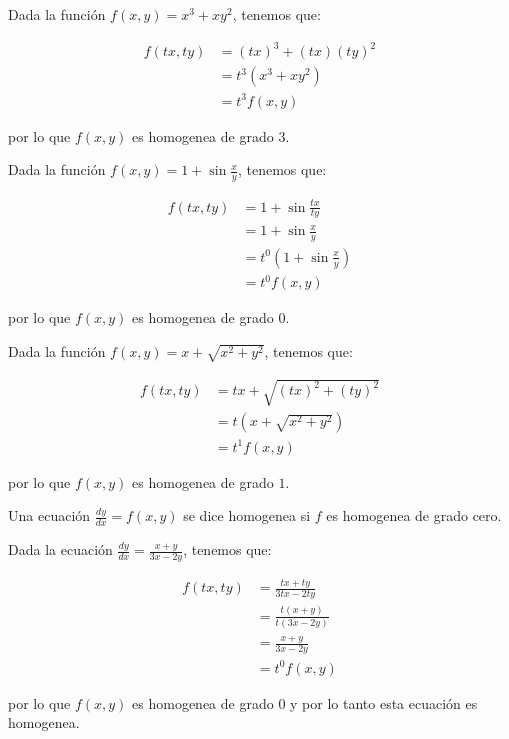 		\begin{ejemplo}
			Dada la función $f(x, y) = x^3 + x y^2$, tenemos que:

			\begin{align*}
				f(tx, ty) &= (tx)^3 + (tx) (ty)^2 \\
				&= t^3 (x^3 + xy^2) \\
				&= t^3 f(x, y)
			\end{align*}

			por lo que $f(x, y)$ es homogenea de grado $3$.
		\end{ejemplo}

		\begin{ejemplo}
			Dada la función $f(x, y) = 1 + \sin{\frac{x}{y}}$, tenemos que:

			\begin{align*}
				f(tx, ty) &= 1 + \sin{\frac{tx}{ty}} \\
				&= 1 + \sin{\frac{x}{y}} \\
				&= t^0 (1 + \sin{\frac{x}{y}}) \\
				&= t^0 f(x, y)
			\end{align*}

			por lo que $f(x, y)$ es homogenea de grado $0$.
		\end{ejemplo}

		\begin{ejemplo}
			Dada la función $f(x, y) = x + \sqrt{x^2 + y^2}$, tenemos que:

			\begin{align*}
				f(tx, ty) &= tx + \sqrt{(tx)^2 + (ty)^2} \\
				&= t (x + \sqrt{x^2 + y^2}) \\
				&= t^1 f(x, y)
			\end{align*}

			por lo que $f(x, y)$ es homogenea de grado $1$.
		\end{ejemplo}

		\begin{definicion}
			Una ecuación $\frac{dy}{dx} = f(x, y)$ se dice homogenea si $f$ es homogenea de grado cero.
		\end{definicion}

		\begin{ejemplo}
			Dada la ecuación $\frac{dy}{dx} = \frac{x + y}{3x - 2y}$, tenemos que:

			\begin{align*}
				f(tx, ty) &= \frac{tx + ty}{3tx - 2ty} \\
				&= \frac{t(x + y)}{t (3x - 2y)} \\
				&= \frac{x + y}{3x - 2y} \\
				&= t^0 f(x, y)
			\end{align*}

			por lo que $f(x, y)$ es homogenea de grado $0$ y por lo tanto esta ecuación es homogenea.
		\end{ejemplo}

